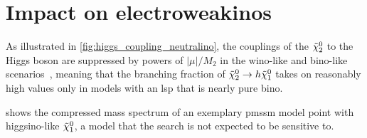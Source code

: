 \FloatBarrier


\section{Impact on electroweakinos}

As illustrated in \cref{fig:higgs_coupling_neutralino}, the couplings of the $\tilde{\chi}_2^0$ to the Higgs boson are suppressed by powers of $\vert\mu\vert/M_2$ in the wino-like and bino-like scenarios~\cite{Arbey:2012fa}, meaning that the branching fraction of $\tilde{\chi}_2^0 \rightarrow h \tilde{\chi}_1^0$ takes on reasonably high values only in models with an \gls{lsp} that is nearly pure bino.

 shows the compressed mass spectrum of an exemplary \gls{pmssm} model point with higgsino-like $\tilde{\chi}_1^0$, a model that the \onelepton search is not expected to be sensitive to.

